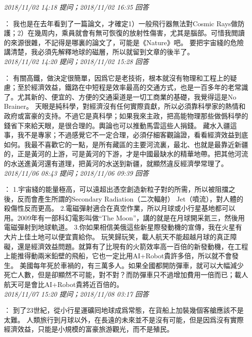 \documentclass[twocolumn]{ctexart}
\begin{document}
\textit{\hfill\noindent\small 2018/11/02 14:18 提问；2018/11/02 16:35 回答}

：
我也是在去年看到了一篇論文，才確定1）一般飛行器無法對Cosmic Rays做防護；2）在幾周内，乘員就會有無可恢復的放射性傷害，尤其是腦部。可惜我閲讀的來源很雜，不記得是哪裏的論文了，可能是《Nature》吧。
要把宇宙綫的危險講清楚，我必須先解釋地球的磁層，所以就留到文章的後半了。
\\

\textit{\hfill\noindent\small 2018/11/02 14:20 提问；2018/11/02 15:28 回答}

：
有關高鐵，做決定很簡單，因爲它是老技術，根本就沒有物理和工程上的疑慮；至於經濟效益，鐵路在中短程是效率最高的交通方式，也是一百多年的老常識了。尤其新的、便宜的、方便的交通渠道是一切工商業的基礎，我覺得這是No Brainer。
天眼是純科學，對經濟沒有任何實際貢獻，所以必須靠科學家的熱情和政府或富豪的支持。不過它是真科學；如果我來主政，把高能物理那些做僞科學的錢省下來給天眼，是很合理的。輿論也可以推動馬雲這些人捐錢。
藏水入疆這事，我不是專家；不過感覺它不一定合理，必須仔細客觀論證，看看經濟效益到底如何。我最不喜歡它的一點，是所有藏區的主要河流裏，最北、也就是最靠近新疆的，正是黃河的上游，可是黃河的下游，才是中國最缺水的精華地帶。把其他河流的水送進黃河還有道理，把黃河的水送到新疆，就顯然違反經濟學常理了。
\\

\textit{\hfill\noindent\small 2018/11/06 08:43 提问；2018/11/06 09:39 回答}

：
1.宇宙綫的能量極高，可以遠超出憑空創造新粒子對的所需，所以被阻擋之後，反而會產生所謂的Secondary Radiation（二次輻射） Jet（噴流），對人體的殺傷性反而更高。 
2.電磁彈射適合在真空作業，所以月球或小行星基地都可以用。2009年有一部科幻電影叫做“The Moon”，講的就是在月球開采氦三，然後用電磁彈射到地球軌道。 
3.你如果相信美俄這些新星際發動機的宣傳，我在火星有大片上佳土地可以便宜賣給你。 
玩笑歸玩笑，載人航天不能超越月球的真正障礙，還是經濟效益問題。就算有了比現有的火箭效率高一百倍的新發動機，在工程上能推得動兩米鉛壁的飛船，它也一定比用AI+Robot貴許多倍，所以就不會發生。 
美國每年死於車禍的，有三萬多人。如果全國都開防彈車，就可以大幅減少死亡人數，但是卻顯然不可能，對不對？而防彈車只不過增加費用一倍而已；載人航天可是會比AI+Robot貴將近百倍的。
\\

\textit{\hfill\noindent\small 2018/11/07 15:20 提问；2018/11/08 03:17 回答}

：
到了23世紀，從小行星運礦囘地球成爲常態，在貨船上加裝幾個客艙應該不是太難。
人類旅行到月球以外，在長遠的未來並不是沒有可能，但是因爲沒有實際經濟效益，只能是小規模的富豪旅游觀光，而不是殖民。
\\
\end{document}

